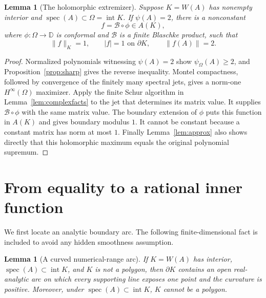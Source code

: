 \documentclass[11pt]{article}
\newtheorem{lemma}[theorem]{Lemma}
\theoremstyle{definition}
\theoremstyle{remark}
\newcommand{\D}{\mathbb D}
\newcommand{\spec}{\operatorname{spec}}
\newcommand{\Int}{\operatorname{int}}
\begin{document}
\begin{lemma}[The holomorphic extremizer]\label{lem:extremizer}
Suppose \(K=W(A)\) has nonempty interior and
\(\spec(A)\subset\Omega=\Int K\).  If \(\psi(A)=2\), there is a nonconstant
\[
 f=\mathcal B\circ\phi\in A(K),
\]
where \(\phi:\Omega\to\D\) is conformal and \(\mathcal B\) is a finite
Blaschke product,
such that
\[
 \|f\|_K=1,\qquad |f|=1\text{ on }\partial K,\qquad
 \|f(A)\|=2.                                          \tag{4.6}
\]
\end{lemma}

\begin{proof}
Normalized polynomials witnessing \(\psi(A)=2\) show
\(\psi_\Omega(A)\geq2\), and Proposition~\ref{prop:sharp} gives the reverse
inequality.  Montel compactness, followed by convergence of the finitely many
spectral jets, gives a norm-one \(H^\infty(\Omega)\) maximizer.  Apply the
finite Schur algorithm in Lemma~\ref{lem:complexfacts} to the jet that
determines its matrix value.  It supplies \(\mathcal B\circ\phi\) with the same matrix
value.  The boundary extension of \(\phi\) puts this function in \(A(K)\) and
gives boundary modulus \(1\).  It cannot be constant because a constant matrix
has norm at most \(1\).  Finally Lemma~\ref{lem:approx} also shows directly
that this holomorphic maximum equals the original polynomial supremum.
\end{proof}

\section{From equality to a rational inner function}

We first locate an analytic boundary arc.  The following finite-dimensional
fact is included to avoid any hidden smoothness assumption.

\begin{lemma}[A curved numerical-range arc]\label{lem:arc}
If \(K=W(A)\) has interior, \(\spec(A)\subset\Int K\), and \(K\) is not a
polygon, then \(\partial K\) contains an open real-analytic arc on which every
supporting line exposes one point and the curvature is positive.
Moreover, under \(\spec(A)\subset\Int K\), \(K\) cannot be a polygon.
\end{lemma}
\end{document}
